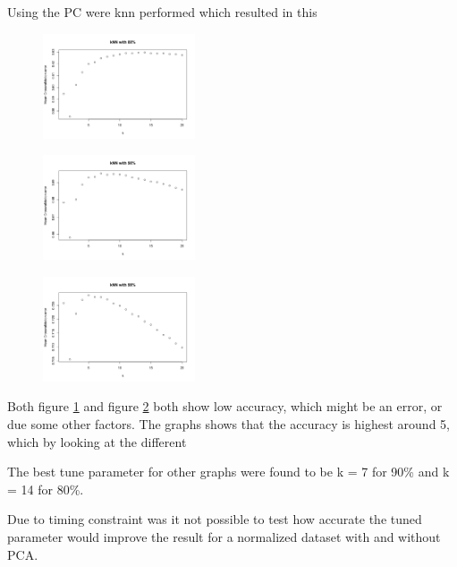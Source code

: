 Using the PC were knn performed which resulted in this

\begin{figure}[H]
\centering
\includegraphics[width = 0.4\textwidth]{graphics/kNN_plot_80.png}
\label{fig:knnFit_80}
\caption{}
\end{figure}


\begin{figure}[H]
\centering
\includegraphics[width = 0.4\textwidth]{graphics/kNN_plot_90.png}
\label{fig:knnFit_90}
\caption{}
\end{figure}


\begin{figure}[H]
\centering
\includegraphics[width = 0.4\textwidth]{graphics/kNN_plot_99.png}
\label{fig:knnFit_99}
\caption{}
\end{figure}

Both figure \ref{fig:knnFit_80} and figure \ref{fig:knnFit_90} both show low accuracy,
which might be an error, or due some other factors. 
 The graphs shows that the accuracy is highest around 5, which by looking at the different

The best tune parameter for other graphs were found to be k = 7 for 90\% and k = 14 for 80\%.


Due to timing constraint was it not possible to test how accurate the tuned parameter
would improve the result for a normalized dataset with and without PCA. 